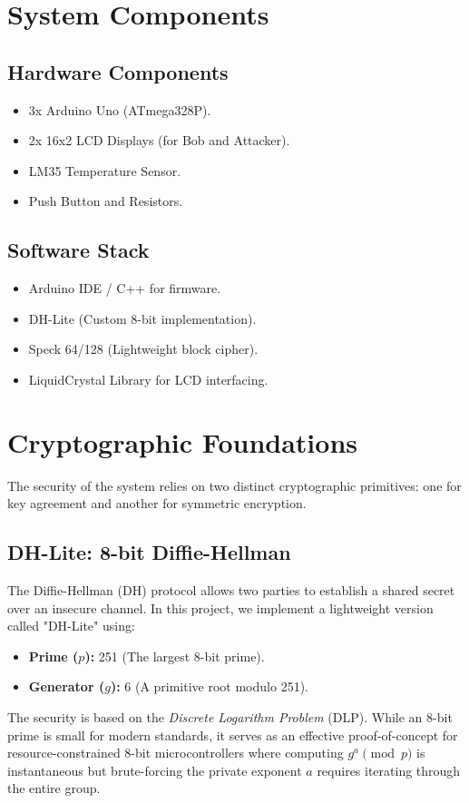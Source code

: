 \documentclass[12pt,a4paper]{article}
\begin{document}
\section{System Components}
\subsection{Hardware Components}
\begin{itemize}
    \item 3x Arduino Uno (ATmega328P).
    \item 2x 16x2 LCD Displays (for Bob and Attacker).
    \item LM35 Temperature Sensor.
    \item Push Button and Resistors.
\end{itemize}

\subsection{Software Stack}
\begin{itemize}
    \item Arduino IDE / C++ for firmware.
    \item DH-Lite (Custom 8-bit implementation).
    \item Speck 64/128 (Lightweight block cipher).
    \item LiquidCrystal Library for LCD interfacing.
\end{itemize}
\newpage

\section{Cryptographic Foundations}
The security of the system relies on two distinct cryptographic primitives: one for key agreement and another for symmetric encryption.

\subsection{DH-Lite: 8-bit Diffie-Hellman}
The Diffie-Hellman (DH) protocol allows two parties to establish a shared secret over an insecure channel. In this project, we implement a lightweight version called "DH-Lite" using:
\begin{itemize}
    \item \textbf{Prime ($p$):} 251 (The largest 8-bit prime).
    \item \textbf{Generator ($g$):} 6 (A primitive root modulo 251).
\end{itemize}
The security is based on the \textit{Discrete Logarithm Problem} (DLP). While an 8-bit prime is small for modern standards, it serves as an effective proof-of-concept for resource-constrained 8-bit microcontrollers where computing $g^a \pmod p$ is instantaneous but brute-forcing the private exponent $a$ requires iterating through the entire group.
\end{document}
